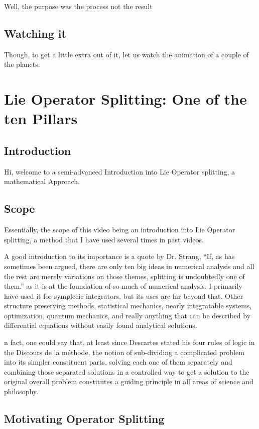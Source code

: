 Well, the purpose was the process not the result

\subsection{Watching it}
Though, to get a little extra out of it, let us watch the animation of a couple of the planets.


\section{Lie Operator Splitting: One of the ten Pillars}

\subsection{Introduction}

Hi, welcome to a semi-advanced Introduction into Lie Operator splitting, a mathematical Approach.


\subsection{Scope}

Essentially, the scope of this video being an introduction into Lie Operator splitting, a method that I have used several times in past videos.

A good introduction to its importance is a quote by Dr. Strang, ``If, as has sometimes been argued, there are only ten big ideas in numerical analysis and all the rest are merely variations on those themes, splitting is undoubtedly one of them.'' as it is at the foundation of so much of numerical analysis. I primarily have used it for symplecic integrators, but its uses are far beyond that. Other structure preserving methods, statistical mechanics, nearly integratable systems, optimization, quantum mechanics, and really anything that can be described by differential equations without easily found analytical solutions.

n fact, one could say that, at least since Descartes stated his four rules of logic in the Discours de la méthode, the notion of sub-dividing a complicated problem into its simpler constituent parts, solving each one of them separately and combining those separated solutions in a controlled way to get a solution to the original overall problem constitutes a guiding principle in all areas of science and philosophy.

\subsection{Motivating Operator Splitting}


